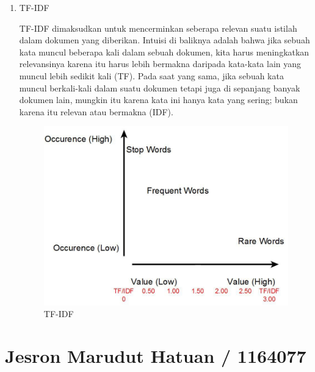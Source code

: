 \begin{enumerate}
\item TF-IDF
\par TF-IDF dimaksudkan untuk mencerminkan seberapa relevan suatu istilah dalam dokumen yang diberikan. Intuisi di baliknya adalah bahwa jika sebuah kata muncul beberapa kali dalam sebuah dokumen, kita harus meningkatkan relevansinya karena itu harus lebih bermakna daripada kata-kata lain yang muncul lebih sedikit kali (TF). Pada saat yang sama, jika sebuah kata muncul berkali-kali dalam suatu dokumen tetapi juga di sepanjang banyak dokumen lain, mungkin itu karena kata ini hanya kata yang sering; bukan karena itu relevan atau bermakna (IDF).
\begin{figure}[ht]
\centering
\includegraphics[scale=0.5]{figures/ch4/6.jpeg}
\caption{TF-IDF}
\label{Contoh Ilustrasi}
\end{figure}
\end{enumerate}


\section{Jesron Marudut Hatuan / 1164077}

